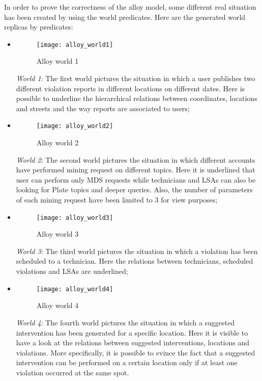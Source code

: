 In order to prove the correctness of the alloy model, some different real situation has been created by using the world predicates.
Here are the generated world replicas by predicates:
\begin{itemize}
    \item 
        \begin{figure}[H]
            \centering
            \texttt{[image: alloy\_world1]}
            \caption{Alloy world 1}
            \label{fig:alloy_World1}
        \end{figure}
        \textit{World 1}: The first world pictures the situation in which a user publishes two different violation reports in different locations on different dates. Here is possible to underline the hierarchical relations between coordinates, locations and streets and the way reports are associated to users;
    \item 
        \begin{figure}[H]
            \centering
            \texttt{[image: alloy\_world2]}
            \caption{Alloy world 2}
            \label{fig:alloy_World2}
        \end{figure}
        \textit{World 2}: The second world pictures the situation in which different accounts have performed mining request on different topics. Here it is underlined that user can perform only MDS requests while technicians and LSAs can also be looking for Plate topics and deeper queries. Also, the number of parameters of each mining request have been limited to 3 for view purposes;
    \item 
        \begin{figure}[H]
            \centering
            \texttt{[image: alloy\_world3]}
            \caption{Alloy world 3}
            \label{fig:alloy_World3}
        \end{figure}
        \textit{World 3}: The third world pictures the situation in which a violation has been scheduled to a technician. Here the relations between technicians, scheduled violations and LSAs are underlined;
        \newpage
    \item 
        \begin{figure}[H]
            \centering
            \texttt{[image: alloy\_world4]}
            \caption{Alloy world 4}
            \label{fig:alloy_World4}
        \end{figure}
        \textit{World 4}: The fourth world pictures the situation in which a suggested intervention has been generated for a specific location. Here it is visible to have a look at the relations between suggested interventions, locations and violations. More specifically, it is possible to evince the fact that a suggested intervention can be performed on a certain location only if at least one violation occurred at the same spot.
\end{itemize}
